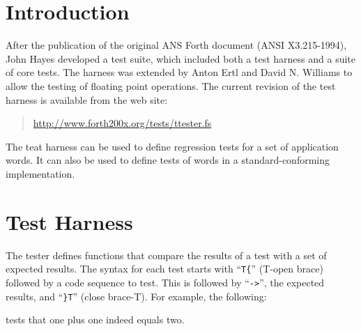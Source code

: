 \label{annex:test}

\section{Introduction} %
\label{test:intro}

After the publication of the original ANS Forth document
(ANSI X3.215-1994), John Hayes developed a test suite, which
included both a test harness and a suite of core tests.  The
harness was extended by Anton Ertl and David N. Williams to
allow the testing of floating point operations.
The current revision of the test harness is available from the
web site:
\begin{quote}
	\url{http://www.forth200x.org/tests/ttester.fs}
\end{quote}



The teat harness can be used to define regression tests for a set of
application words.  It can also be used to define tests of words in
a standard-conforming implementation.

\section{Test Harness}
\label{test:harness}

The tester defines functions that compare the results of a test with
a set of expected results.  The syntax for each test starts with
``\texttt{T\{}'' (T-open brace) followed by a code sequence to test.
This is followed by ``\texttt{->}'', the expected results, and
``\texttt{\}T}'' (close brace-T).  For example, the following:
\begin{quote}
\end{quote}
tests that one plus one indeed equals two.


